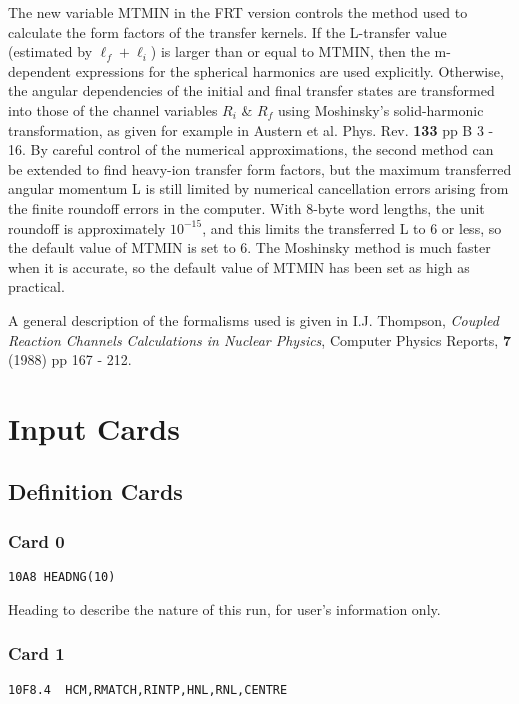 \documentclass[11pt]{article}
\begin{document}
{The new variable MTMIN in the FRT version controls the method used to
calculate the form factors of the transfer kernels. If the L-transfer value
(estimated by $\ell_f + \ell_i$)
is larger than or equal to MTMIN, then the m-dependent expressions for the
spherical harmonics are used explicitly.
Otherwise, the
angular dependencies of the initial and final transfer states
are transformed into those of the channel variables $R_{i}$ \& $R_{f}$ using
Moshinsky's solid-harmonic transformation, as given for example
in
Austern et al. Phys. Rev. {\bf 133} pp B 3 - 16.
%
By careful control of the numerical approximations, the second method can
be extended to find heavy-ion transfer form factors, but the maximum
transferred angular momentum L is still limited by numerical cancellation
errors arising from the finite roundoff errors in the computer.
With 8-byte word lengths, the unit roundoff is approximately $10^{-15}$,
and this limits the transferred L to 6 or less, so the default value
of MTMIN is set to 6. The Moshinsky method is much faster when it is
accurate, so the default value of MTMIN has been set as high as practical.

A general description of the formalisms used is given in
I.J. Thompson,
{\em Coupled Reaction Channels Calculations in Nuclear Physics},
Computer Physics Reports, {\bf 7} (1988) pp 167 - 212.

}
\newpage
\section{Input Cards}
\subsection{Definition Cards}
%
\subsubsection*{Card 0}
\begin{verbatim}
10A8 HEADNG(10)
\end{verbatim}
\smallskip

Heading to describe the nature of this run, for user's information only.
\bigskip

\subsubsection*{Card 1}
\begin{verbatim}
10F8.4  HCM,RMATCH,RINTP,HNL,RNL,CENTRE
\end{verbatim}
%
\end{document}
